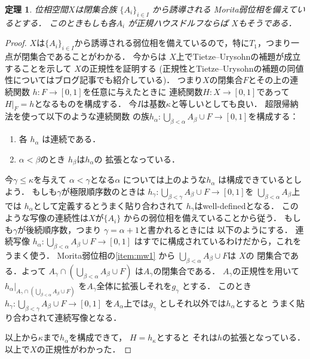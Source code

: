 \documentclass[leqno, a4paper, 12pt]{jsarticle}
\newtheorem{thm}{定理}
\begin{document}
\begin{thm}\label{thm:mw}
位相空間$X$は閉集合族
$\{A_{i}\}_{i\in I}$
から誘導される
Morita弱位相を備えているとする．
このときもしも各$A_{i}$
が正規ハウスドルフならば
$X$もそうである．
\end{thm}
\begin{proof}
$X$は$\{A_{i}\}_{i\in I}$から誘導される弱位相を備えているので，特に$T_{1}$，つまり一点が閉集合であることがわかる．
今からは
$X$上でTietze--Urysohnの補題が成立することを示して
$X$の正規性を証明する
(正規性とTietze--Urysohnの補題の同値性についてはブログ記事\cite{Den1}でも紹介している)．
つまり$X$の閉集合$F$とその上の連続関数
$h\colon F\to [0, 1]$を任意に与えたときに
連続関数$H\colon X\to [0, 1]$であって
$H|_{F}=h$となるものを構成する．
今$I$は基数$\kappa$と等しいとしても良い．
超限帰納法を使って以下のような連続関数
の族$h_{\alpha}\colon \bigcup_{\beta<\alpha}A_{\beta}\cup F\to  [0, 1]$を構成する：
\begin{enumerate}
\item 
各
$h_{\alpha}$
は連続である．
\item 
$\alpha<\beta$のとき
$h_{\beta}$は$h_{\alpha}$の
拡張となっている．
\end{enumerate}
今$\gamma\le \kappa$を与えて
$\alpha<\gamma$となる$\alpha$
については上のような$h_{\alpha}$
は構成できているとしよう．
もしも$\gamma$が極限順序数のときは
$h_{\gamma}\colon  \bigcup_{\beta<\gamma}A_{\beta}\cup F\to  [0, 1]$を
$\bigcup_{\beta<\alpha}A_{\beta}$上では
$h_{\alpha}$として定義するとうまく貼り合わされて
$h_{\gamma}$はwell-definedとなる．
このような写像の連続性は$X$が$\{A_{i}\}$
からの弱位相を備えていることから従う．
もしも$\gamma$が後続順序数，つまり
$\gamma=\alpha+1$と書かれるときには
以下のようにする．
連続写像
$h_{\alpha}\colon \bigcup_{\beta<\alpha}A_{\beta}\cup F\to  [0, 1]$
はすでに構成されているわけだから，これをうまく使う．
Morita弱位相の\ref{item:mw1}
から
$\bigcup_{\beta<\alpha}A_{\beta}\cup F$は
$X$の
閉集合である．よって
$A_{\gamma}\cap 
\left(\bigcup_{\beta<\alpha}A_{\beta}\cup F\right)$
は$A_{\gamma}$の閉集合である．
$A_{\gamma}$の正規性を用いて
$h_{\alpha}|_{A_{\gamma}\cap 
\left(\bigcup_{\beta<\alpha}A_{\beta}\cup F\right)
}$
を$A_{\gamma}$全体に拡張しそれを$g_{\gamma}$
とする．
このとき
$h_{\gamma}\colon   \bigcup_{\beta<\gamma}A_{\beta}\cup F\to  [0, 1]$
を$A_{\alpha}$上では$g_{\gamma}$
としそれ以外では$h_{\alpha}$とすると
うまく貼り合わされて連続写像となる．

以上から$\kappa$まで$h_{\alpha}$を構成できて，
$H=h_{\kappa}$とすると
それは$h$の拡張となっている．
以上で$X$の正規性がわかった．
\end{proof}
\end{document}
